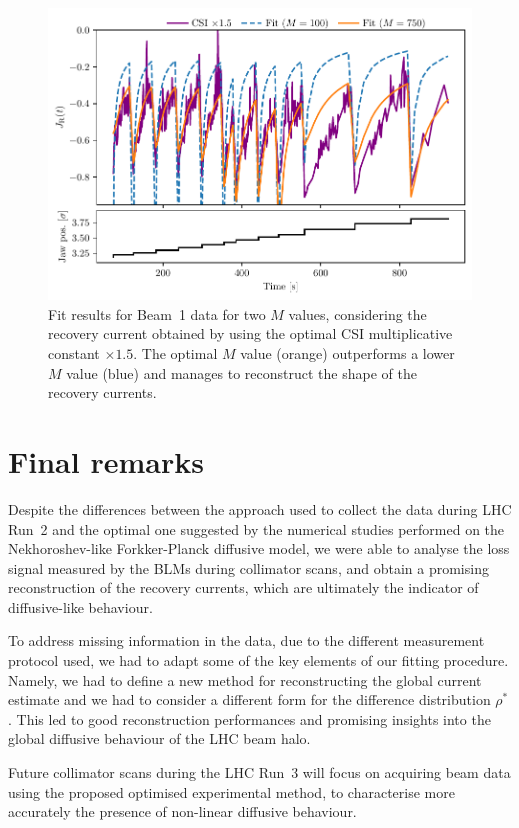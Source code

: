 \begin{figure}[hpt]
    \centering
    \includegraphics[trim={0 2.5mm 0 3mm}, clip, width=0.95\columnwidth]{5_Diffusion_measurement_LHC/figs/fifth.pdf}
    \caption{Fit results for Beam~1 data for two $M$ values, considering the recovery current obtained by using the optimal CSI multiplicative constant $\times 1.5$. The optimal $M$ value (orange) outperforms a lower $M$ value (blue) and manages to reconstruct the shape of the recovery currents.}
    \label{fig:fifth}
\end{figure}
%
\section{Final remarks}
%
Despite the differences between the approach used to collect the data during LHC Run~2 and the optimal one suggested by the numerical studies performed on the Nekhoroshev-like Forkker-Planck diffusive model, we were able to analyse the loss signal measured by the BLMs during collimator scans, and obtain a promising reconstruction of the recovery currents, which are ultimately the indicator of diffusive-like behaviour.

To address missing information in the data, due to the different measurement protocol used, we had to adapt some of the key elements of our fitting procedure. Namely, we had to define a new method for reconstructing the global current estimate and we had to consider a different form for the difference distribution $\rho^\ast$. This led to good reconstruction performances and promising insights into the global diffusive behaviour of the LHC beam halo.

Future collimator scans during the LHC Run~3 will focus on acquiring beam data using the proposed optimised experimental method, to characterise more accurately the presence of non-linear diffusive behaviour. 
